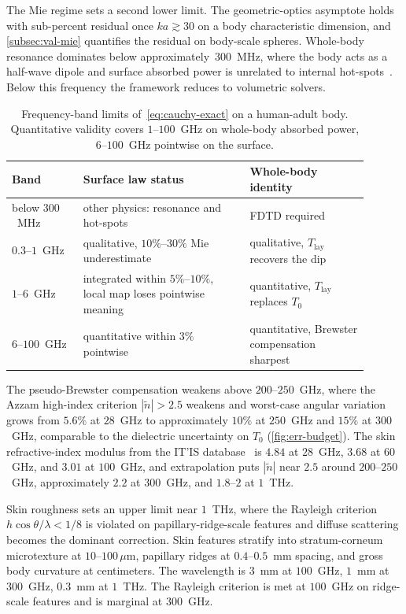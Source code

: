 \documentclass[journal,twocolumn,10pt]{IEEEtran}
\theoremstyle{plain}
\newcommand{\Tlay}{T_{\mathrm{lay}}}
\newcommand{\ntilde}{\tilde{n}}
\begin{document}
The Mie regime sets a second lower limit. The geometric-optics
asymptote holds with sub-percent residual once $ka \gtrsim 30$ on a
body characteristic dimension, and \cref{subsec:val-mie} quantifies
the residual on body-scale spheres. Whole-body resonance dominates
below approximately~$300$~MHz, where the body acts as a half-wave
dipole and surface absorbed power is unrelated to internal
hot-spots~\cite{Durney1986}. Below this frequency the framework
reduces to volumetric solvers.

\begin{table}[!t]
\centering
\caption{Frequency-band limits of~\eqref{eq:cauchy-exact} on a
human-adult body. Quantitative validity covers $1$--$100$~GHz on
whole-body absorbed power, $6$--$100$~GHz pointwise on the
surface.}
\label{tab:bands}
\small
\setlength{\tabcolsep}{4pt}
\begin{tabular}{@{}>{\raggedright\arraybackslash}p{0.18\linewidth}
                  >{\raggedright\arraybackslash}p{0.42\linewidth}
                  >{\raggedright\arraybackslash}p{0.30\linewidth}@{}}
\toprule
Band & Surface law status & Whole-body identity \\
\midrule
below $300$~MHz
  & other physics: resonance and hot-spots
  & FDTD required \\
$0.3$--$1$~GHz
  & qualitative, $10\%$--$30\%$ Mie underestimate
  & qualitative, $\Tlay$ recovers the dip \\
$1$--$6$~GHz
  & integrated within $5\%$--$10\%$, local map loses pointwise meaning
  & quantitative, $\Tlay$ replaces $T_0$ \\
$6$--$100$~GHz
  & quantitative within $3\%$ pointwise
  & quantitative, Brewster compensation sharpest \\
\bottomrule
\end{tabular}
\end{table}

The pseudo-Brewster compensation weakens above $200$--$250$~GHz,
where the Azzam high-index criterion $|\ntilde| > 2.5$ weakens and
worst-case angular variation grows from $5.6\%$ at $28$~GHz to
approximately $10\%$ at $250$~GHz and $15\%$ at $300$~GHz, comparable
to the dielectric uncertainty on $T_0$ (\cref{fig:err-budget}). The
skin refractive-index modulus from the IT'IS database~\cite{ITISv5,Gabriel1996} is $4.84$ at $28$~GHz,
$3.68$ at $60$~GHz, and $3.01$ at $100$~GHz, and extrapolation puts
$|\ntilde|$ near $2.5$ around $200$--$250$~GHz, approximately $2.2$
at $300$~GHz, and $1.8$--$2$ at $1$~THz.

Skin roughness sets an upper limit near $1$~THz, where the Rayleigh
criterion $h\cos\theta/\lambda < 1/8$ is violated on
papillary-ridge-scale features and diffuse scattering becomes the
dominant correction. Skin features stratify into
stratum-corneum microtexture at $10$--$100\,\mu$m, papillary ridges
at $0.4$--$0.5$~mm spacing, and gross body curvature at centimeters.
The wavelength is $3$~mm at $100$~GHz, $1$~mm at $300$~GHz, $0.3$~mm at
$1$~THz. The Rayleigh criterion is met at $100$~GHz on ridge-scale
features and is marginal at $300$~GHz.
\end{document}
